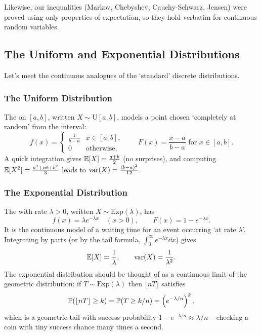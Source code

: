\documentclass[a4paper]{scrartcl}
\begin{document}
Likewise, our inequalities (Markov, Chebyshev, Cauchy-Schwarz, Jensen) were proved using only properties of expectation, so they hold verbatim for continuous random variables.

\subsection{The Uniform and Exponential Distributions}

Let's meet the continuous analogues of the `standard' discrete distributions.

\subsubsection*{The Uniform Distribution}

The  on $[a, b]$, written $X \sim \mathrm{U}[a, b]$, models a point chosen `completely at random' from the interval:
$$
f(x) = \begin{cases}
	\frac{1}{b - a} & x \in [a, b],\\
	0 & \text{otherwise},
\end{cases}
\qquad
F(x) = \frac{x - a}{b - a} \text{ for } x \in [a, b].
$$
A quick integration gives $\mathbb{E}[X] = \frac{a + b}{2}$ (no surprises), and computing $\mathbb{E}[X^2] = \frac{a^2 + ab + b^2}{3}$ leads to $\operatorname{var}(X) = \frac{(b-a)^2}{12}$.

\subsubsection*{The Exponential Distribution}

The  with rate $\lambda > 0$, written $X \sim \mathrm{Exp}(\lambda)$, has
$$
f(x) = \lambda e^{-\lambda x} \quad (x > 0), \qquad F(x) = 1 - e^{-\lambda x}.
$$
It is the continuous model of a waiting time for an event occurring `at rate $\lambda$'. Integrating by parts (or by the tail formula, $\int_0^\infty e^{-\lambda x}\dd x$) gives
$$
\mathbb{E}[X] = \frac{1}{\lambda}, \qquad \operatorname{var}(X) = \frac{1}{\lambda^2}.
$$
The exponential distribution should be thought of as a continuous limit of the geometric distribution: if $T \sim \mathrm{Exp}(\lambda)$ then $\lfloor nT \rfloor$ satisfies
$$
\mathbb{P}(\lfloor nT \rfloor \geq k) = \mathbb{P}(T \geq k/n) = \left(e^{-\lambda/n}\right)^k,
$$
which is a geometric tail with success probability $1 - e^{-\lambda/n} \approx \lambda/n$ -- checking a coin with tiny success chance many times a second.
\end{document}
